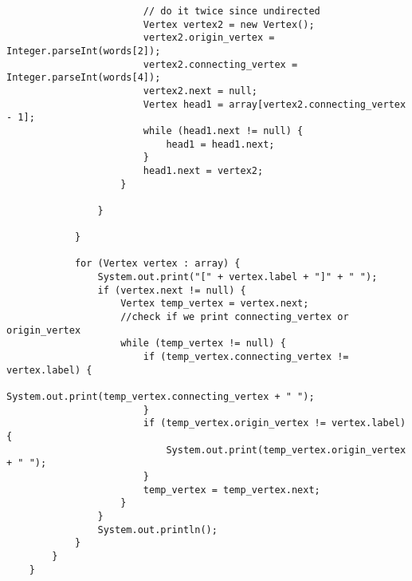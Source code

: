 \documentclass{article}
\begin{document}
\begin{lstlisting}
                        // do it twice since undirected
                        Vertex vertex2 = new Vertex();
                        vertex2.origin_vertex = Integer.parseInt(words[2]);
                        vertex2.connecting_vertex = Integer.parseInt(words[4]);
                        vertex2.next = null;
                        Vertex head1 = array[vertex2.connecting_vertex - 1];
                        while (head1.next != null) {
                            head1 = head1.next;
                        }
                        head1.next = vertex2;
                    }

                }

            }

            for (Vertex vertex : array) {
                System.out.print("[" + vertex.label + "]" + " ");
                if (vertex.next != null) {
                    Vertex temp_vertex = vertex.next;
                    //check if we print connecting_vertex or origin_vertex
                    while (temp_vertex != null) {
                        if (temp_vertex.connecting_vertex != vertex.label) {
                            System.out.print(temp_vertex.connecting_vertex + " ");
                        }
                        if (temp_vertex.origin_vertex != vertex.label) {
                            System.out.print(temp_vertex.origin_vertex + " ");
                        }
                        temp_vertex = temp_vertex.next;
                    }
                }
                System.out.println();
            }
        }
    }


\end{lstlisting}
\end{document}
